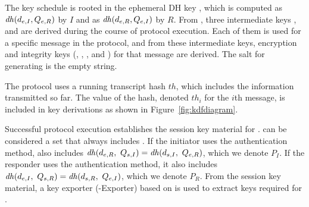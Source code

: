 The key schedule is rooted in the ephemeral DH key
\mGxy{}, which is computed as $\mathit{dh}(d_{e,I}, Q_{e,R})$ by $I$ and as $\mathit{dh}(d_{e,R}, Q_{e,I})$
by $R$.
%
From \mGxy{}, three intermediate keys \mPRKtwo, \mPRKthree{} and
\mPRKfour{} are derived during the course of protocol execution.
%
Each of them is used for a specific message in the protocol, and from
these intermediate keys, encryption and integrity keys
(\mKtwoe, \mKtwom{}, \mKthreeae, and \mKthreem) for that message are derived.
%
The salt for generating \mPRKtwo{} is the empty string.
%

The protocol uses a running transcript hash $th$, which includes the information
transmitted so far.
%
The value of the hash, denoted $th_i$ for the $i$th message, is included in key
derivations as shown in Figure~\ref{fig:kdfdiagram}.
%

Successful protocol execution establishes the session key material \mSessKey{}
for \mOscore{}.
%
\mSessKey{} can be considered a set that always includes \mGxy{}.
%
If the initiator uses the \mStat{} authentication method, \mSessKey{} also
includes
$\mDH(\mY,\ \mGi{}) = \mDH(\mPriv{I},\ \mGy)$, which we denote $P_I$.
%
If the responder uses the \mStat{} authentication method, it also includes
$\mDH(\mX,\ \mGr{}) = \mDH(\mPriv{R},\ \mGx)$, which we denote $P_R$.
%
From the session key material, a key exporter (\mEdhoc-Exporter) based on
\mHkdf{} is used to extract keys required for \mOscore{}.
%

\begin{figure*}[!h]
\centering
\scalebox{.785}{

}
\caption{Key schedule: Light blue boxes hold DH keys ($P_e, P_I, P_R$),
orange boxes intermediate key material (\mPRKtwo, \mPRKthree, \mPRKfour), and
dark blue boxes keys for \mAead{} or \mXor{} encryption
(\mKtwoe, \mKtwom, \mKthreeae, \mKthreem).
Dashed boxes are conditionals.}
\label{fig:kdfdiagram}
\end{figure*}

